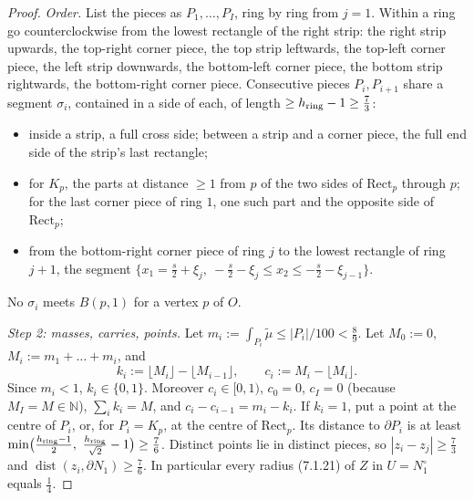 \documentclass[11pt]{article}
\theoremstyle{definition}
\theoremstyle{remark}
\newcommand{\N}{\mathbb N}
\begin{document}
\begin{proof}
\emph{Order.} List the pieces as $P_1,\dots,P_I$, ring by ring from $j=1$. Within a ring go
counterclockwise from the lowest rectangle of the right strip: the right strip upwards, the
top-right corner piece, the top strip leftwards, the top-left corner piece, the left strip
downwards, the bottom-left corner piece, the bottom strip rightwards, the bottom-right corner piece.
Consecutive pieces $P_i,P_{i+1}$ share a segment $\sigma_i$, contained in a side of each, of length
$\ge h_{\rm ring}-1\ge\tfrac73$:
\begin{itemize}[leftmargin=*]
\item inside a strip, a full cross side; between a strip and a corner piece, the full end side of
  the strip's last rectangle;
\item for $K_p$, the parts at distance $\ge1$ from $p$ of the two sides of $\mathrm{Rect}_p$ through $p$; for
  the last corner piece of ring $1$, one such part and the opposite side of $\mathrm{Rect}_p$;
\item from the bottom-right corner piece of ring $j$ to the lowest rectangle of ring $j+1$,
  the segment $\{x_1=\tfrac s2+\xi_j,\ -\tfrac s2-\xi_j\le x_2\le-\tfrac s2-\xi_{j-1}\}$.
\end{itemize}
No $\sigma_i$ meets $B(p,1)$ for a vertex $p$ of $O$.

\emph{Step 2: masses, carries, points.} Let $m_i:=\int_{P_i}\tilde\mu\le|P_i|/100<\tfrac89$. Let
$M_0:=0$, $M_i:=m_1+\dots+m_i$, and
\[
k_i:=\lfloor M_i\rfloor-\lfloor M_{i-1}\rfloor,\qquad c_i:=M_i-\lfloor M_i\rfloor .
\]
Since $m_i<1$, $k_i\in\{0,1\}$. Moreover $c_i\in[0,1)$, $c_0=0$, $c_I=0$ (because $M_I=M\in\N$),
$\sum_ik_i=M$, and $c_i-c_{i-1}=m_i-k_i$. If $k_i=1$, put a point at the centre of $P_i$, or, for
$P_i=K_p$, at the centre of $\mathrm{Rect}_p$. Its distance to $\partial P_i$ is at least
$\min\bigl(\tfrac{h_{\rm ring}-1}2,\ \tfrac{h_{\rm ring}}{\sqrt2}-1\bigr)\ge\tfrac76$. Distinct points lie in
distinct pieces, so $|z_i-z_j|\ge\tfrac73$ and $\operatorname{dist}(z_i,\partial N_1)\ge\tfrac76$. In particular
every radius (7.1.21) of $Z$ in $U=N_1^\circ$ equals $\tfrac14$.


\end{proof}
\end{document}
